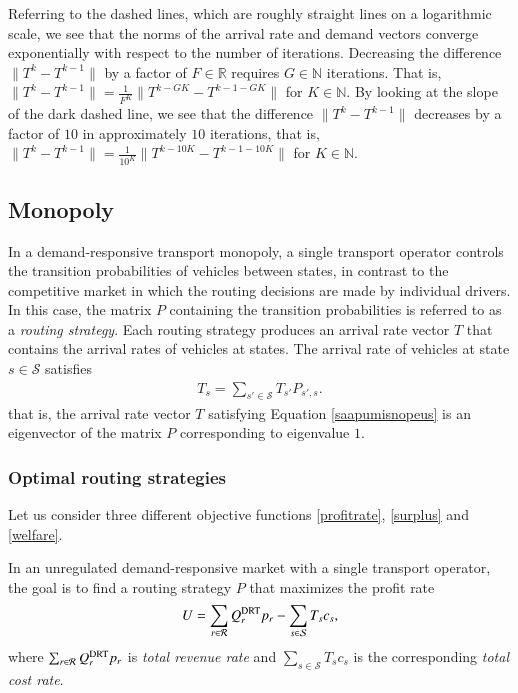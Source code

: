 \documentclass[dissertation,draft*]{aaltoseries}
\begin{document}
Referring to the dashed lines, which are roughly straight lines on a logarithmic scale, 
we see that the norms of the arrival rate and demand vectors converge exponentially
with respect to the number of iterations. Decreasing the difference $\|T^k -T^{k-1}\|$ by a factor of $F \in \mathbb{R}$
requires $G \in \mathbb{N}$ iterations. That is, $\|T^k -T^{k-1}\| = \frac{1}{F^K} \|T^{k-GK} -T^{k-1-GK}\|$
for $K \in \mathbb{N}$.
By looking at the slope of the dark dashed line, we see that the 
difference $\|T^k -T^{k-1}\|$ decreases 
by a factor of $10$ in approximately $10$ iterations, that is, $\|T^k -T^{k-1}\| = \frac {1}{10^K} \|T^{k-10K} -T^{k-1-10K}\|$
for $K \in \mathbb{N}$.




\subsection{Monopoly}
In a demand-responsive transport monopoly, a single transport operator controls the transition probabilities of vehicles
between states, in contrast to the competitive market in which the routing decisions are made by individual drivers.
In this case, the matrix $P$ containing the transition probabilities is referred to as a \emph{routing strategy}.
Each routing strategy produces an arrival rate vector $T$ that contains the arrival rates of
vehicles at states.
The arrival rate of vehicles 
at state $s \in \mathcal{S}$ satisfies
\begin{align}
\label{saapumisnopeusb}
T_s = \sum_{s' \in \mathcal{S}} T_{s'} P_{s',s}.
\end{align}
that is, the arrival rate vector $T$ satisfying Equation \eqref{saapumisnopeus} 
is an eigenvector of the matrix $P$ corresponding to eigenvalue $1$.

\subsubsection{Optimal routing strategies}
Let us consider three different objective functions \eqref{profitrate}, \eqref{surplus} and \eqref{welfare}.

In an unregulated demand-responsive market with a single transport operator, 
the goal is to find a routing strategy $P$ that maximizes the profit rate
\begin{align}
\label{profitrate}
U = \sum_{r \in \mathcal{R}}  Q_r^{\rm DRT} p_r - \sum_{s \in \mathcal{S}} T_s c_{s},
\end{align}
where $\sum_{r \in \mathcal{R}}  Q_r^{\rm DRT} p_r$ is \emph{total revenue rate} 
and $\sum_{s \in \mathcal{S}} T_s c_{s}$ is
the corresponding \emph{total cost rate}. 
\end{document}
